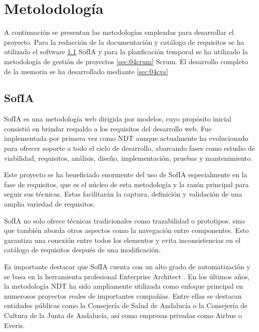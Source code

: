\chapter{Metolodología}\label{cap:04metodologia}

A continuación se presentan las metodologías empleadas para desarrollar el proyecto. Para la redacción de la documentación y catálogo de requisitos se ha utilizado el software \ref{sec:04sofia} SofIA y para la planficación temporal se ha utilizado la metodología de gestión de proyectos \ref{sec:04crum} Scrum. El desarrollo completo de la memoria se ha desarrollado mediante \ref{sec:04cvs}


\section{SofIA} \label{sec:04sofia} %

SofIA \cite{escalona2023} es una metodología web dirigida por modelos, cuyo propósito inicial consistió en brindar respaldo a los requisitos del desarrollo web. Fue implementada por primera vez como NDT aunque actualmente ha evolucionado para ofrecer soporte a todo el ciclo de desarrollo, abarcando fases como estudio de viabilidad, requisitos, análisis, diseño, implementación, pruebas y mantenimiento.

Este proyecto se ha beneficiado enormente del uso de SofIA especialmente en la fase de requisitos, que es el núcleo de esta metodología y la razón principal para seguir sus técnicas. Estas facilitarán la captura, definición y validación de una amplia variedad de requisitos.

SofIA no solo ofrece técnicas tradicionales como trazabilidad o prototipos, sino que también aborda otros aspectos como la navegación entre componentes. Esto garantiza una conexión entre todos los elementos y evita inconsistencias en el catálogo de requisitos después de una modificación.

Es importante destacar que SofIA cuenta con un alto grado de automatización y se basa en la herramienta profesional Enterprise Architect \cite{licenciaEA}. En los últimos años, la metodología NDT ha sido ampliamente utilizada como enfoque principal en numerosos proyectos reales de importantes compañías. Entre ellas se destacan entidades públicas como la Consejería de Salud de Andalucía o la Consejería de Cultura de la Junta de Andalucía, así como empresas privadas como Airbus o Everis. 

